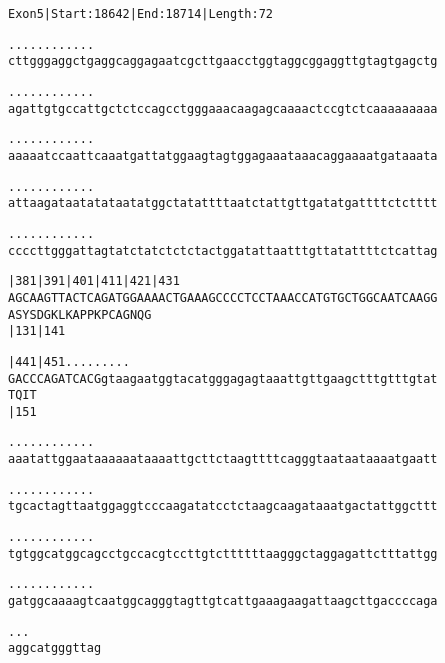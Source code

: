 \documentclass{article}
\begin{document}
\begin{alltt}
Exon 5 | Start: 18642 | End: 18714 | Length: 72

.    .    .    .    .    .    .    .    .    .    .    .    
cttgggaggctgaggcaggagaatcgcttgaacctggtaggcggaggttgtagtgagctg

.    .    .    .    .    .    .    .    .    .    .    .    
agattgtgccattgctctccagcctgggaaacaagagcaaaactccgtctcaaaaaaaaa

.    .    .    .    .    .    .    .    .    .    .    .    
aaaaatccaattcaaatgattatggaagtagtggagaaataaacaggaaaatgataaata

.    .    .    .    .    .    .    .    .    .    .    .    
attaagataatatataatatggctatattttaatctattgttgatatgattttctctttt

.    .    .    .    .    .    .    .    .    .    .    .    
ccccttgggattagtatctatctctctactggatattaatttgttatattttctcattag

|381      |391      |401      |411      |421      |431      
AGCAAGTTACTCAGATGGAAAACTGAAAGCCCCTCCTAAACCATGTGCTGGCAATCAAGG
 A  S  Y  S  D  G  K  L  K  A  P  P  K  P  C  A  G  N  Q  G 
          |131                          |141                

|441      |451   .    .    .    .    .    .    .    .    .  
GACCCAGATCACGgtaagaatggtacatgggagagtaaattgttgaagctttgtttgtat
 T  Q  I  T                                                 
          |151                                              

  .    .    .    .    .    .    .    .    .    .    .    .  
aaatattggaataaaaaataaaattgcttctaagttttcagggtaataataaaatgaatt

  .    .    .    .    .    .    .    .    .    .    .    .  
tgcactagttaatggaggtcccaagatatcctctaagcaagataaatgactattggcttt

  .    .    .    .    .    .    .    .    .    .    .    .  
tgtggcatggcagcctgccacgtccttgtcttttttaagggctaggagattctttattgg

  .    .    .    .    .    .    .    .    .    .    .    .  
gatggcaaaagtcaatggcagggtagttgtcattgaaagaagattaagcttgaccccaga

  .    .    .
aggcatgggttag
\end{alltt}
\newpage
\end{document}
